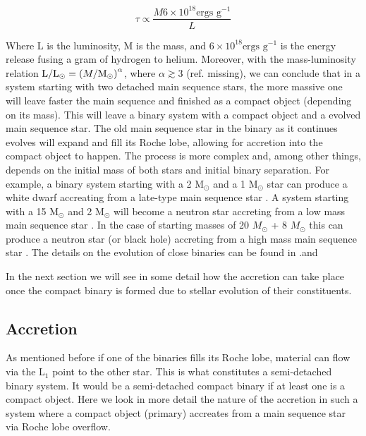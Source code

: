 \begin{equation}
        \tau \propto \frac{ M 6 \times 10^{18} \text{ergs g}^{-1}}{L}
\end{equation}

Where L is the luminosity, M is the mass,  and $6\times 10^{18} \text{ergs g}^{-1}$ is the energy release fusing a gram of hydrogen to helium. Moreover, with the mass-luminosity relation $ \text L / \text L _\odot = \left  (M / \text M _\odot \right )^\alpha $, where $\alpha \gtrsim 3$ (ref. missing), we can conclude that in a system starting with two detached main sequence stars, the more massive one will leave faster the main sequence and finished as a compact object (depending on its mass). This will leave a binary system with a compact object and a evolved main sequence star. The old main sequence star in the binary as it continues evolves will expand and fill its Roche lobe, allowing for accretion into the compact object to happen.  The process is more complex and, among other things, depends on the initial mass of both stars and initial binary separation. For example, a binary system starting with a 2 M$_\odot$  and  a 1 M$_\odot$ star can produce a white dwarf accreating from a late-type main sequence star \citep{kippenhahn_entwicklung_1967,de_loore_structure_1992}. A system starting with a 15 M$_\odot$ and 2 M$_\odot$ will become a neutron star accreting from a low mass main sequence star \citep{heuvel_late_1976}. In the case of starting masses of 20 $M_\odot$ + 8 $M_\odot$ this can produce a neutron star (or black hole) accreting from a high mass main sequence star \citep{heuvel_late_1976}. The details on the evolution of close binaries can be found in \cite{postnov_evolution_2014}.and \citep{de2008stars}


In the next section we will see in some detail how the accretion can take place once the compact binary is formed due to stellar evolution of their constituents. 

\subsection{Accretion}

As mentioned before if one of the binaries fills its Roche lobe, material can flow via the L$_1$ point to the other star. This is what constitutes a semi-detached binary system. It would be a semi-detached compact binary if at least one is a compact object. Here we look in more detail the nature of the accretion in such a system where a compact object (primary) accreates from a main sequence star via Roche lobe overflow. 

